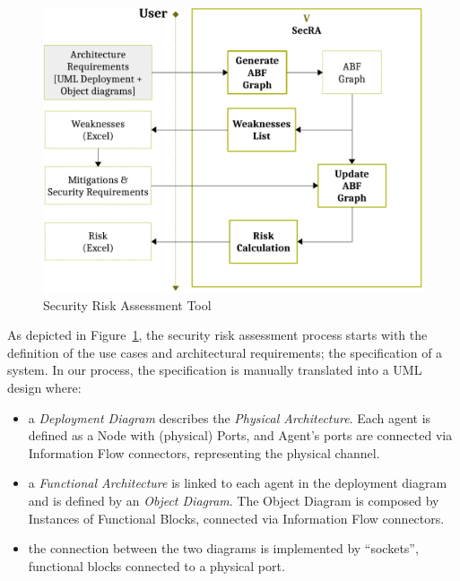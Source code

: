 \documentclass[conference]{IEEEtran}
\begin{document}
\begin{figure}
	\centering
	\includegraphics[width=\columnwidth]{v-secra.pdf}
	\caption{Security Risk Assessment Tool}
	\label{fig:secra}
\end{figure}
As depicted in Figure~\ref{fig:secra}, the security risk assessment process
starts with the definition of the use cases and architectural requirements; the
specification of a system.  In our process, the specification is manually
translated into a UML design where:
\begin{itemize}
	\item a \emph{Deployment Diagram} describes the \emph{Physical
		Architecture}. Each agent is defined as a Node with (physical)
		Ports, and Agent's ports are connected via Information Flow
		connectors, representing the physical channel.
	\item a \emph{Functional Architecture} is linked to each agent in the
		deployment diagram and is defined by an \emph{Object Diagram}.
		The Object Diagram is composed by Instances of Functional
		Blocks, connected via Information Flow connectors.
	\item the connection between the two diagrams is implemented by
		``sockets'', functional blocks connected to a 
		physical port.
\end{itemize}
\end{document}
